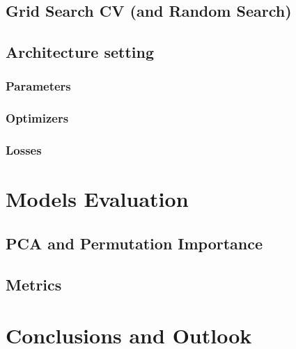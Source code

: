 \documentclass[%
 reprint,
 amsmath,amssymb,
 aps,
]{revtex4-1}
\begin{document}
\subsection{\label{sec:level2}Grid Search CV (and Random Search)}

\subsection{\label{sec:level2}Architecture setting}

\subsubsection{Parameters}

\subsubsection{Optimizers}

\subsubsection{Losses}


\section{\label{sec:level1}Models Evaluation}

\subsection{\label{sec:level2}PCA and Permutation Importance}

\subsection{\label{sec:level2}Metrics}




\section{\label{sec:level1}Conclusions and Outlook}










\end{document}
